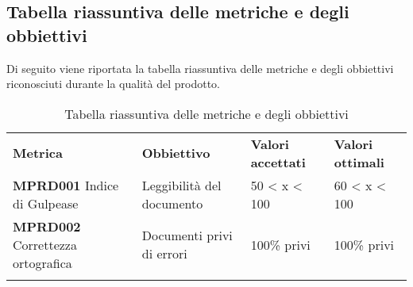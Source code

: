\subsection{Tabella riassuntiva delle metriche e degli obbiettivi}
Di seguito viene riportata la tabella riassuntiva delle metriche e degli obbiettivi riconosciuti durante la qualità del prodotto.
\begin{center}
	\renewcommand{\arraystretch}{1.5}
	\begin{longtable}{  p{2cm}  p{5cm} p{2.5cm}  p{2.5cm}  }
		\rowcolor{tableHeadYellow}
		\textbf{Metrica}   & \textbf{Obbiettivo} & \textbf{Valori \mbox{accettati}} & \textbf{Valori \mbox{ottimali}}\\
		\textbf{MPRD001} Indice di Gulpease & Leggibilità del documento & 50 < x < 100 & 60 < x < 100 \\
		\textbf{MPRD002} Correttezza ortografica & Documenti privi di errori & 100\% privi & 100\% privi \\
		\caption{Tabella riassuntiva delle metriche e degli obbiettivi}
	\end{longtable}
\end{center}
